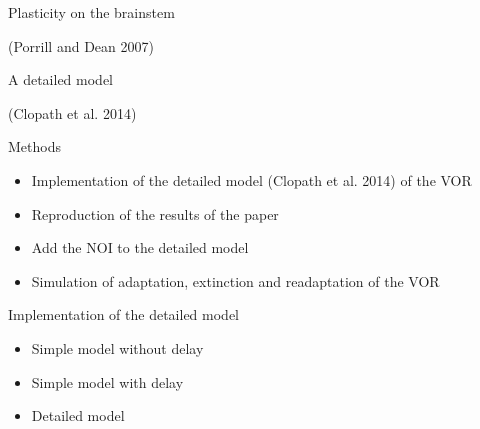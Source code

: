 \documentclass[ignorenonframetext,]{beamer}
\begin{document}
\begin{frame}{Plasticity on the brainstem}

(Porrill and Dean 2007)

\end{frame}

\begin{frame}{A detailed model}

(Clopath et al. 2014)

\end{frame}

\begin{frame}{Methods}

\begin{itemize}
\itemsep1pt\parskip0pt
\item
  Implementation of the detailed model (Clopath et al. 2014) of the VOR
\item
  Reproduction of the results of the paper
\item
  Add the NOI to the detailed model
\item
  Simulation of adaptation, extinction and readaptation of the VOR
\end{itemize}

\end{frame}

\begin{frame}{Implementation of the detailed model}

\begin{itemize}
\itemsep1pt\parskip0pt
\item
  Simple model without delay
\item
  Simple model with delay
\item
  Detailed model
\end{itemize}

\end{frame}
\end{document}
